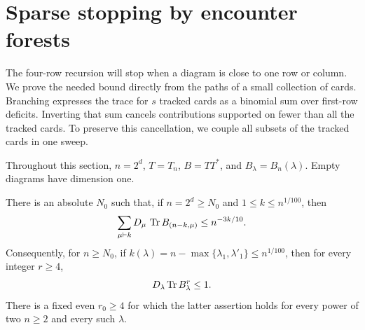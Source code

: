 \section{Sparse stopping by encounter forests}\label{sec:sparse}
The four-row recursion will stop when a diagram is close to one row or column. We prove the needed bound directly from the paths of a small collection of cards. Branching expresses the trace for $s$ tracked cards as a binomial sum over first-row deficits. Inverting that sum cancels contributions supported on fewer than all the tracked cards. To preserve this cancellation, we couple all subsets of the tracked cards in one sweep.

Throughout this section, $n=2^d$, $T=T_n$, $B=TT^*$, and $B_\lambda=B_n(\lambda)$. Empty diagrams have dimension one.

\begin{lemma}
\label{lem:sparse}
There is an absolute $N_0$ such that, if $n=2^d\ge N_0$ and
$1\le k\le n^{1/100}$, then
\[
 \sum_{\mu\vdash k}D_\mu\,
     \operatorname{Tr} B_{(n-k,\mu)}\le n^{-3k/10}.
\]
Consequently, for $n\ge N_0$, if
$k(\lambda)=n-\max\{\lambda_1,\lambda'_1\}\le n^{1/100}$,
then for every integer $r\ge4$,
\[
 D_\lambda\operatorname{Tr} B_\lambda^r\le1.
\]
There is a fixed even $r_0\ge4$ for which the latter assertion holds
for every power of two $n\ge2$ and every such $\lambda$.
\end{lemma}

